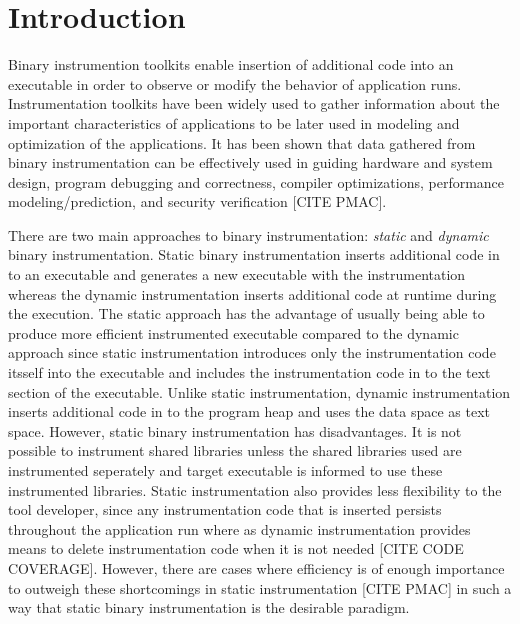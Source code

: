 \section{Introduction}

Binary instrumention toolkits enable insertion of additional code into an
executable in order to observe or modify the behavior of application runs. 
Instrumentation toolkits have been widely used to gather information about the
important characteristics of applications to be later used in modeling and optimization
of the applications. It has been shown that data gathered 
from binary instrumentation can be effectively used in guiding hardware and
system design, program debugging and correctness, compiler optimizations,
performance modeling/prediction, and security verification [CITE PMAC].

There are two main approaches to binary instrumentation: \textit{static} 
and \textit{dynamic} binary instrumentation. Static binary
instrumentation inserts additional code in to an executable and generates a new
executable with the instrumentation whereas the dynamic instrumentation inserts additional code 
at runtime during the execution. The static approach has the advantage of usually being able to produce
more efficient instrumented executable compared to the dynamic approach
since static instrumentation introduces only the instrumentation code itsself into the executable
 and includes the instrumentation code in to the text section of the executable. Unlike static instrumentation, dynamic
instrumentation inserts additional code in to the program heap and uses the data space as text space.
However, static binary instrumentation has disadvantages. It is not possible to instrument shared libraries 
unless the shared libraries used are instrumented seperately and target executable is informed to use these instrumented libraries. 
Static instrumentation also provides less flexibility to the tool developer, since any instrumentation code that is
inserted persists throughout the application run where as dynamic instrumentation 
provides means to delete instrumentation code when it is not needed [CITE CODE COVERAGE].
However, there are cases where efficiency is of enough importance to outweigh
these shortcomings in static instrumentation [CITE PMAC] in such a way that static binary instrumentation is the
desirable paradigm.

